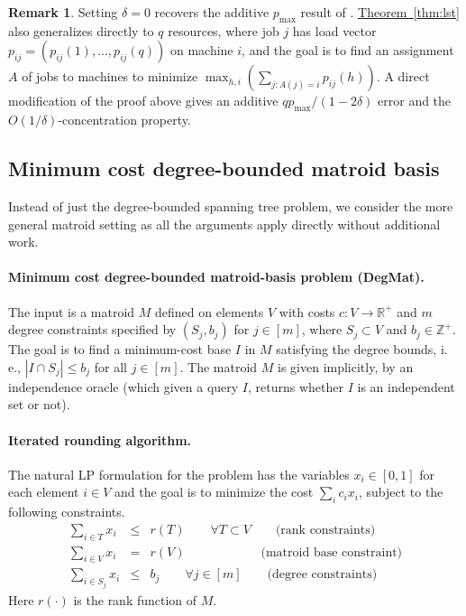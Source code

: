 \documentclass[11pt]{article}
\theoremstyle{definition}
\newtheorem{remark}[theorem]{Remark}
\newcommand{\expref}[2]{\texorpdfstring{\hyperref[#2]{#1~\ref{#2}}}{#1~\ref{#2}}}
\newcommand{\R}{{\mathbb R}}
\newcommand{\ie}{i.\,e.}
\begin{document}
\begin{remark} Setting $\delta = 0$ recovers the additive $p_{\max}$ result of \cite{LST}. 
\expref{Theorem}{thm:lst} also generalizes directly to $q$ resources, where 
job $j$ has load vector $p_{ij} = (p_{ij}(1),\ldots,p_{ij}(q))$ on machine $i$, and the goal is to find an
assignment $A$  of jobs to machines to minimize $\max_{h,i} (\sum_{j: A(j)=i} p_{ij}(h))$.
A direct modification of the proof above gives an additive $q p_{\max}/(1-2\delta) $ error and the $O(1/\delta)$-concentration property.
\end{remark}
%
%
%

\subsection{Minimum cost degree-bounded matroid basis} %
%
\label{s:spanning-tree}
Instead of just the degree-bounded spanning tree problem, we consider the more general matroid setting as all the arguments apply directly without additional work.
\paragraph{Minimum cost degree-bounded matroid-basis problem (DegMat).}
The input is a matroid $M$ defined
on elements $V$ with costs $c:V \rightarrow \R^+$ and $m$ degree constraints specified by $(S_j , b_j)$ for $j\in [m]$,
where
$S_j \subset V$ and $b_j \in \mathbb{Z}^+$. The goal is to find a minimum-cost base $I$ in $M$ satisfying the degree bounds, \ie, $|I \cap S_j | \leq b_j$ for all $j \in [m]$. The matroid $M$
is given implicitly, by an independence oracle (which given a query $I$, returns whether $I$ is an independent set or not).

\paragraph{Iterated rounding algorithm.}
The natural LP formulation for the problem has the variables $x_i \in [0,1]$ for each element $i\in V$ and the goal is to minimize the cost $ \sum_i c_i x_i$, subject to the following constraints.
\begin{eqnarray*}
\sum_{i \in T} x_i & \leq & r(T)  \qquad \forall T \subset V   \qquad  \text{(rank constraints)}\\
\sum_{i \in V} x_i &= & r(V) \qquad \qquad \qquad  \text{(matroid base constraint)} \\
\sum_{i \in S_j} x_i & \leq  & b_j  \qquad \forall j \in [m]  \qquad \text{(degree constraints)}
 \end{eqnarray*}
Here $r(\cdot)$ is the rank function of $M$.
\end{document}
